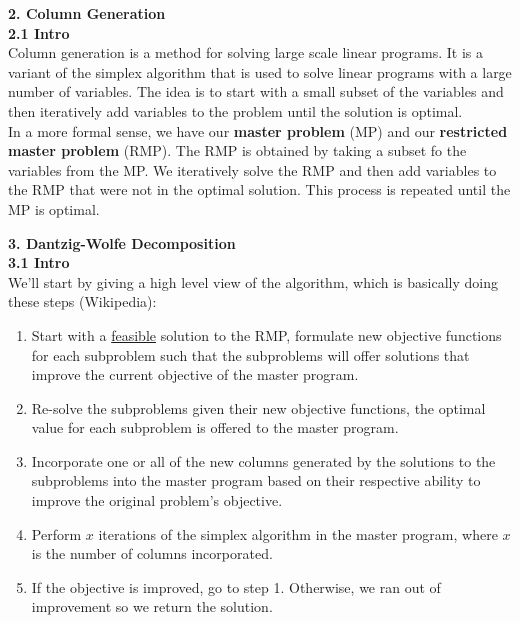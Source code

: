 \documentclass[11pt]{article}
\begin{document}
\newpage

\noindent \textbf{\large{2. Column Generation}}
\\

\noindent \textbf{2.1 Intro}
\\

\noindent Column generation is a method for solving large scale linear programs. It is a variant of the simplex algorithm that is used to solve linear programs with a large number of variables. The idea is to start with a small subset of the variables and then iteratively add variables to the problem until the solution is optimal.
\\

\noindent In a more formal sense, we have our \textbf{master problem} (MP) and our \textbf{restricted master problem} (RMP). The RMP is obtained by taking a subset fo the variables from the MP. We iteratively solve the RMP and then add variables to the RMP that were not in the optimal solution. This process is repeated until the MP is optimal.

\newpage

\noindent \textbf{\large{3. Dantzig-Wolfe Decomposition}}
\\

\noindent \textbf{3.1 Intro}
\\

\noindent We'll start by giving a high level view of the algorithm, which is basically doing these steps (Wikipedia):
\begin{enumerate}
    \item Start with a \underline{feasible} solution to the RMP, formulate new objective functions for each subproblem such that the subproblems will offer solutions that improve the current objective of the master program.
    \item Re-solve the subproblems given their new objective functions, the optimal value for each subproblem is offered to the master program.
    \item Incorporate one or all of the new columns generated by the solutions to the subproblems into the master program based on their respective ability to improve the original problem's objective.
    \item Perform \(x\) iterations of the simplex algorithm in the master program, where \(x\) is the number of columns incorporated.
    \item If the objective is improved, go to step 1. Otherwise, we ran out of improvement so we return the solution.
\end{enumerate}
\end{document}
